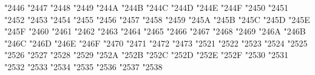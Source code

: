 {\Uchar\jis"2446 %
\Uchar\jis"2447 %
\Uchar\jis"2448 %
\Uchar\jis"2449 %
\Uchar\jis"244A %
\Uchar\jis"244B %
\Uchar\jis"244C %
\Uchar\jis"244D %
\Uchar\jis"244E %
\Uchar\jis"244F %
\Uchar\jis"2450 %
\Uchar\jis"2451 %
\Uchar\jis"2452 %
\Uchar\jis"2453 %
\Uchar\jis"2454 %
\Uchar\jis"2455 %
\Uchar\jis"2456 %
\Uchar\jis"2457 %
\Uchar\jis"2458 %
\Uchar\jis"2459 %
\Uchar\jis"245A %
\Uchar\jis"245B %
\Uchar\jis"245C %
\Uchar\jis"245D %
\Uchar\jis"245E %
\Uchar\jis"245F %
\Uchar\jis"2460 %
\Uchar\jis"2461 %
\Uchar\jis"2462 %
\Uchar\jis"2463 %
\Uchar\jis"2464 %
\Uchar\jis"2465 %
\Uchar\jis"2466 %
\Uchar\jis"2467 %
\Uchar\jis"2468 %
\Uchar\jis"2469 %
\Uchar\jis"246A %
\Uchar\jis"246B %
\Uchar\jis"246C %
\Uchar\jis"246D %
\Uchar\jis"246E %
\Uchar\jis"246F %
\Uchar\jis"2470 %
\Uchar\jis"2471 %
\Uchar\jis"2472 %
\Uchar\jis"2473 %
\Uchar\jis"2521 %
\Uchar\jis"2522 %
\Uchar\jis"2523 %
\Uchar\jis"2524 %
\Uchar\jis"2525 %
\Uchar\jis"2526 %
\Uchar\jis"2527 %
\Uchar\jis"2528 %
\Uchar\jis"2529 %
\Uchar\jis"252A %
\Uchar\jis"252B %
\Uchar\jis"252C %
\Uchar\jis"252D %
\Uchar\jis"252E %
\Uchar\jis"252F %
\Uchar\jis"2530 %
\Uchar\jis"2531 %
\Uchar\jis"2532 %
\Uchar\jis"2533 %
\Uchar\jis"2534 %
\Uchar\jis"2535 %
\Uchar\jis"2536 %
\Uchar\jis"2537 %
\Uchar\jis"2538 %
}
